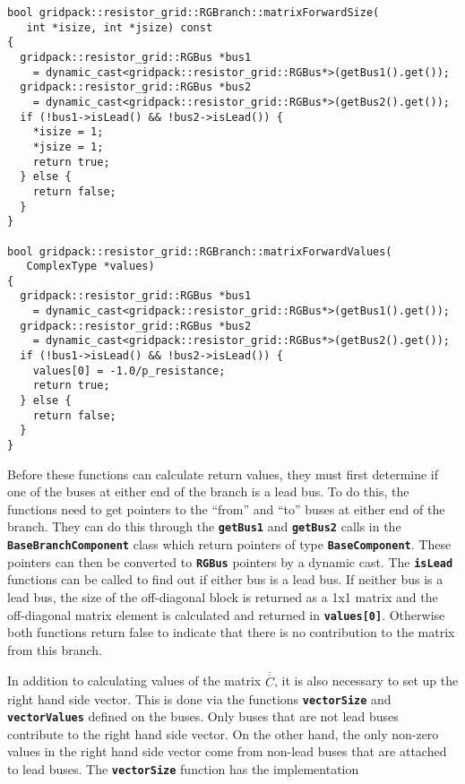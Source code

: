 {
\color{red}
\begin{Verbatim}[fontseries=b]
bool gridpack::resistor_grid::RGBranch::matrixForwardSize(
   int *isize, int *jsize) const
{
  gridpack::resistor_grid::RGBus *bus1
    = dynamic_cast<gridpack::resistor_grid::RGBus*>(getBus1().get());
  gridpack::resistor_grid::RGBus *bus2
    = dynamic_cast<gridpack::resistor_grid::RGBus*>(getBus2().get());
  if (!bus1->isLead() && !bus2->isLead()) {
    *isize = 1;
    *jsize = 1;
    return true;
  } else { 
    return false;
  }
}

bool gridpack::resistor_grid::RGBranch::matrixForwardValues(
   ComplexType *values)
{
  gridpack::resistor_grid::RGBus *bus1
    = dynamic_cast<gridpack::resistor_grid::RGBus*>(getBus1().get());
  gridpack::resistor_grid::RGBus *bus2
    = dynamic_cast<gridpack::resistor_grid::RGBus*>(getBus2().get());
  if (!bus1->isLead() && !bus2->isLead()) {
    values[0] = -1.0/p_resistance;
    return true;
  } else {
    return false;
  }
}
\end{Verbatim}
}

Before these functions can calculate return values, they must first determine if one of the buses at either end of the branch is a lead bus. To do this, the functions need to get pointers to the ``from'' and ``to'' buses at either end of the branch. They can do this through the \texttt{\textbf{getBus1}} and \texttt{\textbf{getBus2}} calls in the \texttt{\textbf{BaseBranchComponent}} class which return pointers of type \texttt{\textbf{BaseComponent}}. These pointers can then be converted to \texttt{\textbf{RGBus}} pointers by a dynamic cast. The \texttt{\textbf{isLead}} functions can be called to find out if either bus is a lead bus. If neither bus is a lead bus, the size of the off-diagonal block is returned as a 1x1 matrix and the off-diagonal matrix element is calculated and returned in \texttt{\textbf{values[0]}}. Otherwise both functions return false to indicate that there is no contribution to the matrix from this branch.

In addition to calculating values of the matrix $\overline{\overline{C}}$, it is
also necessary to set up the right hand side vector. This is done via the
functions \texttt{\textbf{vectorSize}} and \texttt{\textbf{vectorValues}}
defined on the buses. Only buses that are not lead buses contribute to the right
hand side vector. On the other hand, the only non-zero values in the right hand
side vector come from non-lead buses that are attached to lead buses. The \texttt{\textbf{vectorSize}} function has the implementation

